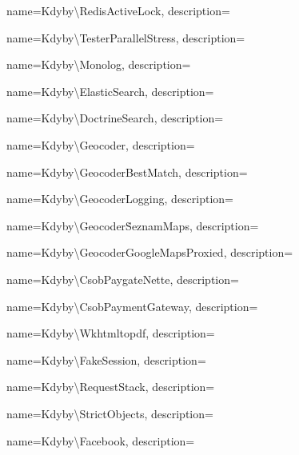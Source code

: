  {
  name={Kdy\-by\textbackslash{}Re\-dis\-Acti\-ve\-Lock},
  description={} }

 {
  name={Kdy\-by\textbackslash{}Tes\-ter\-Pa\-ra\-ll\-el\-St\-ress},
  description={} }

 {
  name={Kdy\-by\textbackslash{}Mo\-no\-log},
  description={} }

 {
  name={Kdy\-by\textbackslash{}Elastic\-Sear\-ch},
  description={} }

 {
  name={Kdy\-by\textbackslash{}Doc\-tri\-ne\-Sear\-ch},
  description={} }

 {
  name={Kdy\-by\textbackslash{}Geo\-co\-der},
  description={} }

 {
  name={Kdy\-by\textbackslash{}Geo\-co\-der\-Be\-st\-Ma\-tch},
  description={} }

 {
  name={Kdy\-by\textbackslash{}Geo\-co\-der\-Log\-g\-ing},
  description={} }

 {
  name={Kdy\-by\textbackslash{}Geo\-co\-der\.Se\-z\-nam\-Ma\-ps},
  description={} }

 {
  name={Kdy\-by\textbackslash{}Geo\-co\-der\-Goo\-gle\-Ma\-ps\-Pro\-xi\-ed},
  description={} }

 {
  name={Kdy\-by\textbackslash{}C\-s\-o\-b\-Pay\-ga\-te\-Ne\-tte},
  description={} }

 {
  name={Kdy\-by\textbackslash{}C\-s\-o\-b\-Pay\-me\-nt\-Ga\-te\-way},
  description={} }

 {
  name={Kdy\-by\textbackslash{}Wk\-html\-to\-pdf},
  description={} }

 {
  name={Kdy\-by\textbackslash{}Fa\-ke\-Ses\-si\-on},
  description={} }

 {
  name={Kdy\-by\textbackslash{}Re\-que\-st\-Sta\-ck},
  description={} }

 {
  name={Kdy\-by\textbackslash{}Stri\-ct\-Ob\-je\-ct\-s},
  description={} }

 {
  name={Kdy\-by\textbackslash{}Fa\-ce\-book},
  description={} }

